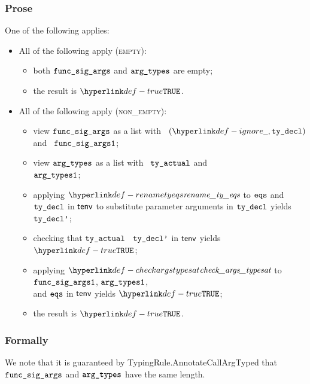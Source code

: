 \subsubsection{Prose}
One of the following applies:
\begin{itemize}
  \item All of the following apply (\textsc{empty}):
  \begin{itemize}
    \item both $\texttt{func\_sig\_args}$ and $\texttt{arg\_types}$ are empty;
    \item the result is $\True$.
  \end{itemize}

  \item All of the following apply (\textsc{non\_empty}):
  \begin{itemize}
    \item view $\texttt{func\_sig\_args}$ as a list with \head\ $(\Ignore, \tydecl)$ and \tail\ $\texttt{func\_sig\_args1}$;
    \item view $\texttt{arg\_types}$ as a list with \head\ $\texttt{ty\_actual}$ and \tail\ \\
          $\texttt{arg\_types1}$;
    \item applying $\renametyeqs$ to $\texttt{eqs}$ and $\texttt{ty\_decl}$ in $\textsf{tenv}$
          to substitute parameter arguments in $\texttt{ty\_decl}$ yields $\texttt{ty\_decl'}$\ProseOrTypeError;
    \item checking that $\texttt{ty\_actual}$ \typesatisfies\ $\texttt{ty\_decl'}$ in $\textsf{tenv}$ yields $\True$\ProseOrTypeError;
    \item applying $\checkargstypesat$ to $\texttt{func\_sig\_args1}$, $\texttt{arg\_types1}$, \\
          and $\texttt{eqs}$ in $\textsf{tenv}$
          yields $\True$\ProseOrTypeError;
    \item the result is $\True$.
  \end{itemize}
\end{itemize}

\subsubsection{Formally}
We note that it is guaranteed by TypingRule.AnnotateCallArgTyped
that $\texttt{func\_sig\_args}$ and $\texttt{arg\_types}$ have the same length.


